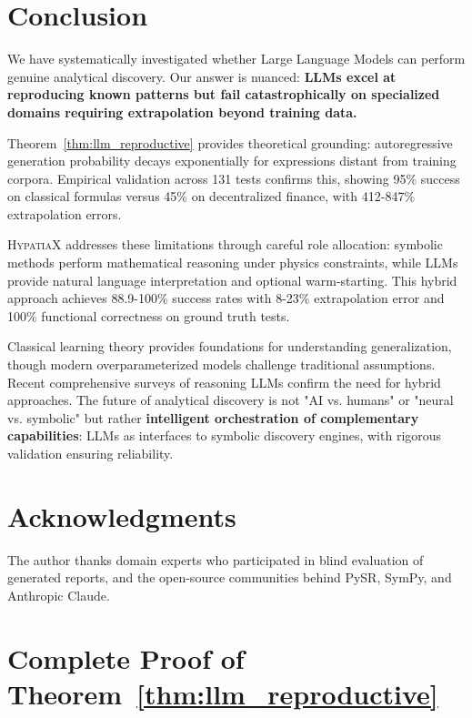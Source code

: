 
\section{Conclusion}

We have systematically investigated whether Large Language Models can perform genuine analytical discovery. Our answer is nuanced: \textbf{LLMs excel at reproducing known patterns but fail catastrophically on specialized domains requiring extrapolation beyond training data.}

Theorem~\ref{thm:llm_reproductive} provides theoretical grounding: autoregressive generation probability decays exponentially for expressions distant from training corpora. Empirical validation across 131 tests confirms this, showing 95\% success on classical formulas versus 45\% on decentralized finance, with 412-847\% extrapolation errors.

\textsc{HypatiaX} addresses these limitations through careful role allocation: symbolic methods perform mathematical reasoning under physics constraints, while LLMs provide natural language interpretation and optional warm-starting. This hybrid approach achieves 88.9-100\% success rates with 8-23\% extrapolation error and 100\% functional correctness on ground truth tests.

Classical learning theory \citep{vapnik1999overview,bishop2006pattern,goodfellow2016deep} provides foundations for understanding generalization, though modern overparameterized models challenge traditional assumptions. Recent comprehensive surveys \citep{zhang2025survey} of reasoning LLMs confirm the need for hybrid approaches. The future of analytical discovery is not "AI vs. humans" or "neural vs. symbolic" but rather \textbf{intelligent orchestration of complementary capabilities}: LLMs as interfaces to symbolic discovery engines, with rigorous validation ensuring reliability.

\section*{Acknowledgments}

The author thanks domain experts who participated in blind evaluation of generated reports, and the open-source communities behind PySR, SymPy, and Anthropic Claude.



\appendix

\section{Complete Proof of Theorem~\ref{thm:llm_reproductive}}
\label{app:proof}

